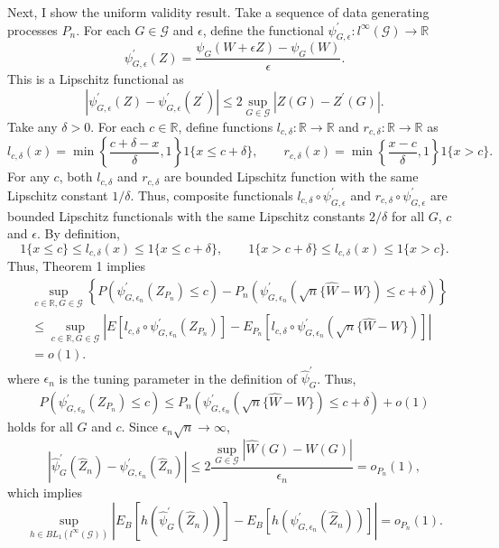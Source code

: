 \documentclass[12pt,oneside,reqno,english]{amsart}
\theoremstyle{definition}
\begin{document}
Next, I show the uniform validity result. Take a sequence of data generating processes $P_{n}$.
For each $G\in \mathcal{G}$ and $\epsilon$, define the functional $\psi^{\prime}_{G,\epsilon}:l^{\infty}(\mathcal{G})\rightarrow \mathbb{R}$ 
\[\psi^{\prime}_{G,\epsilon}(Z)=\frac{\psi_{G}(W+\epsilon Z)-\psi_{G}(W)}{\epsilon}.\]
This is a Lipschitz functional as 
\[|\psi^{\prime}_{G,\epsilon}(Z)-\psi^{\prime}_{G,\epsilon}(Z^{\prime})|\leq 2\sup_{G\in \mathcal{G}}|Z(G)-Z^{\prime}(G)|.\]
Take any $\delta>0$. For each $c\in \mathbb{R}$, define functions $l_{c,\delta}:\mathbb{R}\rightarrow \mathbb{R}$ and $r_{c,\delta}:\mathbb{R}\rightarrow \mathbb{R}$ as 
\[l_{c,\delta}(x)=\min\left\{\frac{c+\delta-x}{\delta},1\right\}1\{x \leq c+\delta\},\qquad r_{c,\delta}(x)=\min\left\{\frac{x-c}{\delta},1\right\}1\{x>c\}.\]
For any $c$, both $l_{c,\delta}$ and $r_{c,\delta}$ are bounded Lipschitz function with the same Lipschitz constant $1/\delta$. 
Thus, composite functionals $l_{c,\delta}\circ \psi^{\prime}_{G,\epsilon}$ and $r_{c,\delta}\circ \psi^{\prime}_{G,\epsilon}$ are bounded Lipschitz functionals
with the same Lipschitz constants $2/\delta$ for all $G$, $c$ and $\epsilon$.
By definition, 
\[1\{x \leq c\}\leq l_{c,\delta}(x)\leq 1\{x\leq c+\delta\},\qquad 1\{x > c+\delta \}\leq l_{c,\delta}(x)\leq 1\{x> c\}.\]
Thus, Theorem 1 implies
\begin{align*}
&\sup_{c\in \mathbb{R},G\in \mathcal{G}}\left\{P(\psi^{\prime}_{G,\epsilon_{n}}(Z_{P_{n}})\leq c)-P_{n}(\psi^{\prime}_{G,\epsilon_{n}}(\sqrt{n}\{\hat{W}-W\})\leq c+\delta)\right\}\nonumber\\
&\leq \sup_{c\in \mathbb{R},G\in \mathcal{G}}|E[l_{c,\delta}\circ \psi^{\prime}_{G,\epsilon_{n}}(Z_{P_{n}})]-E_{P_{n}}[l_{c,\delta}\circ\psi^{\prime}_{G,\epsilon_{n}}(\sqrt{n}\{\hat{W}-W\})]|\nonumber\\
&=o(1). 
\end{align*}
where $\epsilon_{n}$ is the tuning parameter in the definition of $\hat{\psi}_{G}^{\prime}$. 
Thus, 
\begin{align}
P(\psi^{\prime}_{G,\epsilon_{n}}(Z_{P_{n}})\leq c)\leq P_{n}(\psi^{\prime}_{G,\epsilon_{n}}(\sqrt{n}\{\hat{W}-W\})\leq c+\delta)+o(1)\label{eq:a1}
\end{align}
holds for all $G$ and $c$. 
Since $\epsilon_{n}\sqrt{n}\rightarrow \infty$, 
\[|\hat{\psi}^{\prime}_{G}(\hat{Z}_{n})-\psi^{\prime}_{G,\epsilon_{n}}(\hat{Z}_{n})|\leq 2\frac{\sup_{G\in \mathcal{G}}|\hat{W}(G)-W(G)|}{\epsilon_{n}}=o_{P_{n}}(1),\]
which implies
\[\sup_{h\in BL_{1}(l^{\infty}(\mathcal{G}))} |E_{B}[h(\hat{\psi}^{\prime}_{G}(\hat{Z}_{n}))]-E_{B}[h(\psi^{\prime}_{G,\epsilon_{n}}(\hat{Z}_{n}))]|=o_{P_{n}}(1).\]
\end{document}
